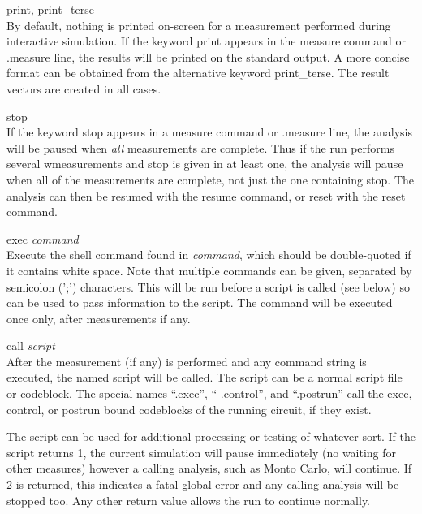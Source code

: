 \begin{description}
\item{{\vt print}, {\vt print\_terse}}\\
By default, nothing is printed on-screen for a measurement performed
during interactive simulation.  If the keyword {\vt print} appears in
the {\cb measure} command or {\vt .measure} line, the results will be
printed on the standard output.  A more concise format can be obtained
from the alternative keyword {\vt print\_terse}.  The result vectors
are created in all cases.

\item{\vt stop}\\
If the keyword {\vt stop} appears in a {\cb measure} command or {\vt
.measure} line, the analysis will be paused when {\it all}
measurements are complete.  Thus if the run performs several
wmeasurements and {\vt stop} is given in at least one, the analysis
will pause when all of the measurements are complete, not just the one
containing {\vt stop}.  The analysis can then be resumed with the {\cb
resume} command, or reset with the {\cb reset} command.

\item{{\vt exec} {\it command}}\\
Execute the {\WRspice} shell command found in {\it command\/}, which
should be double-quoted if it contains white space.  Note that
multiple commands can be given, separated by semicolon ({\vt ';'})
characters.  This will be run before a script is called (see below) so
can be used to pass information to the script.  The command will be
executed once only, after measurements if any.

\item{{\vt call} {\it script}}\\
After the measurement (if any) is performed and any command string is
executed, the named script will be called.  The script can be a normal
script file or codeblock.  The special names ``{\vt .exec}'', ``{\vt
.control}'', and ``{\vt .postrun}'' call the exec, control, or postrun
bound codeblocks of the running circuit, if they exist.

The script can be used for additional processing or testing of
whatever sort.  If the script returns 1, the current simulation will
pause immediately (no waiting for other measures) however a calling
analysis, such as Monto Carlo, will continue.  If 2 is returned, this
indicates a fatal global error and any calling analysis will be
stopped too.  Any other return value allows the run to continue
normally.
\end{description}

